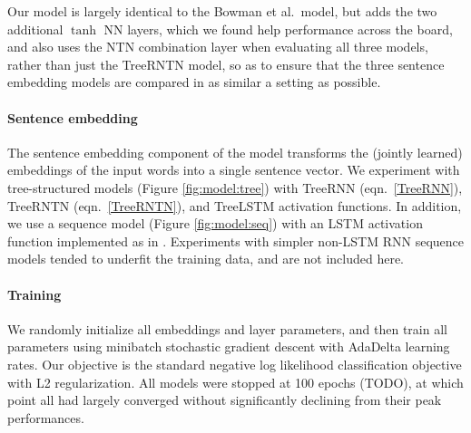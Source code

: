 Our model is largely identical to the Bowman et al.~model, but adds the two additional $\tanh$ NN layers, which we found help performance across the board, and also uses the NTN combination layer when evaluating all three models, rather than just the TreeRNTN model, so as to ensure that the three sentence embedding models are compared in as similar a setting as possible.

\paragraph{Sentence embedding}
The sentence embedding component of the model transforms the (jointly learned) embeddings of the input words into a single sentence vector. We experiment with tree-structured models (Figure \ref{fig:model:tree}) with TreeRNN (eqn.~\ref{TreeRNN}), TreeRNTN (eqn.~\ref{TreeRNTN}), and TreeLSTM \cite{tai2015improved} activation functions. In addition, we use a sequence model (Figure \ref{fig:model:seq}) with an LSTM activation function \cite{hochreiter1997long} implemented as in . Experiments with simpler non-LSTM RNN sequence models tended to underfit the training data, and are not included here.

\paragraph{Training} We randomly initialize all embeddings and layer parameters, and then train all parameters using minibatch stochastic gradient descent with AdaDelta \cite{zeiler2012adadelta} learning rates. Our objective is the standard negative log likelihood classification objective with L2 regularization. All models were stopped at 100 epochs (TODO), at which point all had largely converged without significantly declining from their peak performances.
